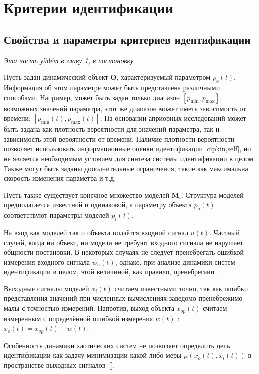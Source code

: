 \chapter{Критерии идентификации}

\section{Свойства и параметры критериев идентификации}

\textit{ Эта часть уйдёт в главу 1, в постановку}

Пусть задан динамический объект $ \mathbf{O}$, характеризуемый параметром $p_o(t)$.
Информация об этом параметре может быть представлена
различными способами. Например, может быть задан только диапазон
$[p_{\min}, p_{\max}]$,
возможных значений параметра,
этот же диапазон может иметь зависимость от времени:
$[p_{\min}(t), p_{\max}(t)]$.
На основании априорных исследований может
быть задана как плотность вероятности для значений параметра,
так и зависимость этой вероятности от времени. Наличие плотности вероятности
позволяет использовать информационные оценки идентификации [cipkin,self],
но не является необходимым условием для синтеза системы идентификации в целом.
Также могут быть заданы дополнительные ограничения, такие как максимальна скорость
изменения параметра и т.д.

Пусть также существует конечное множество моделей
$\mathbf{M}_i$. Структура моделей предполагается известной и одинаковой,
а параметру объекта $p_o(t)$ соответствуют параметры моделей $p_{i}(t)$.

На вход как моделей так и объекта подаётся входной сигнал $u(t)$.
Частный случай, когда ни объект, ни модели не требуют входного сигнала
не нарушает общности постановки. В некоторых случаях
не следует пренебрегать ошибкой измерения входного сигнала $w_u(t)$,
однако, при анализе динамики систем идентификации в целом,
этой величиной, как правило, пренебрегают.

Выходные сигналы моделей
$x_i(t)$ считаем известными точно, так как ошибки
представления значений при численных вычислениях заведомо
пренебрежимо малы с точностью измерений. Напротив,
выход объекта $x_{op}(t)$ считаем измеренным
с определённой ошибкой измерения $w(t)$ : $x_o(t) = x_{op}(t) + w(t)$.

Особенность динамики хаотических систем не позволяет
определить цель идентификации как задачу минимизации
какой-либо меры $\mu(x_o(t),x_i(t))$ в пространстве выходных
сигналов~[].

